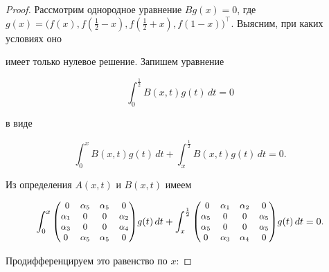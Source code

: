 \begin{proof} 

Рассмотрим однородное уравнение $Bg(x)=0$, где $g(x)=\bigl(f(x),f(\frac12-x),f(\frac12+x),f(1-x)\bigr)^{\top}$. Выясним, при каких условиях оно

имеет только нулевое решение. Запишем уравнение

$$

\int ^{\frac{1}{2}}_{0}B(x,t)g(t)\,dt=0

$$  

в виде

$$

\int ^{x}_{0}B(x,t)g(t)\,dt+\int ^{\frac{1}{2}}_{x}B(x,t)g(t)\,dt=0.

$$

Из определения $A(x,t)$ и $B(x,t)$ имеем

$$

\int ^{x}_{0}

{\small

\begin{pmatrix}

\ 0& \alpha_5 & \alpha_5& 0 \\

\alpha_1 & 0 & 0 & \alpha_2\\

\alpha_3 & 0 & 0 & \alpha_4\\

0& \alpha_5 & \alpha_5& 0

\end{pmatrix}

}

g(t)\,dt+

\int ^{\frac{1}{2}}_{x}

{\small

\begin{pmatrix}

\ 0& \alpha_1 & \alpha_2& 0 \\

\alpha_5 & 0 & 0 & \alpha_5\\

\alpha_5 & 0 & 0 & \alpha_5\\

0& \alpha_3 & \alpha_4& 0

\end{pmatrix}

}

g(t)\,dt=0.

$$



Продифференцируем это равенство по $x$:


\end{proof}
